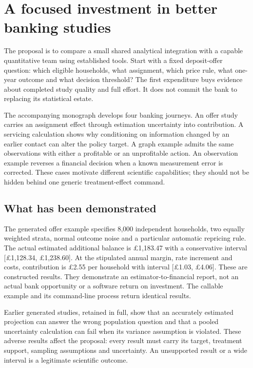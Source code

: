 \chapter*{A focused investment in better banking studies}

The proposal is to compare a small shared analytical integration with a
capable quantitative team using established tools. Start with a fixed
deposit-offer question: which eligible households, what assignment, which
price rule, what one-year outcome and what decision threshold? The first
expenditure buys evidence about completed study quality and full effort.
It does not commit the bank to replacing its statistical estate.

The accompanying monograph develops four banking journeys. An offer study
carries an assignment effect through estimation uncertainty into contribution.
A servicing calculation shows why conditioning on information changed by an
earlier contact can alter the policy target. A graph example admits the same
observations with either a profitable or an unprofitable action. An observation
example reverses a financial decision when a known measurement error is
corrected. These cases motivate different scientific capabilities; they
should not be hidden behind one generic treatment-effect command.

\section*{What has been demonstrated}
The generated offer example specifies 8,000 independent households, two
equally weighted strata, normal outcome noise and a particular automatic
repricing rule. The actual estimated additional balance is \pounds1,183.47
with a conservative interval [\pounds1,128.34, \pounds1,238.60]. At the
stipulated annual margin, rate increment and costs, contribution is
\pounds2.55 per household with interval [\pounds1.03, \pounds4.06].
These are constructed results. They demonstrate an estimator-to-financial
report, not an actual bank opportunity or a software return on investment.
The callable example and its command-line process return identical results.

Earlier generated studies, retained in full, show that an accurately
estimated projection can answer the wrong population question and that a
pooled uncertainty calculation can fail when its variance assumption is
violated. These adverse results affect the proposal: every result must
carry its target, treatment support, sampling assumptions and uncertainty.
An unsupported result or a wide interval is a legitimate scientific outcome.

